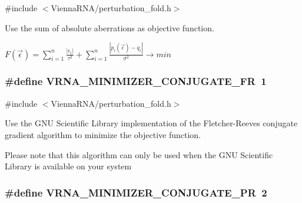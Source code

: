 {\ttfamily \#include $<$Vienna\+R\+N\+A/perturbation\+\_\+fold.\+h$>$}



Use the sum of absolute aberrations as objective function. 

$ F(\vec\epsilon) = \sum_{i = 1}^n{ \frac{|\epsilon_i|}{\tau^2} } + \sum_{i = 1}^n{ \frac{|p_i(\vec\epsilon) - q_i|}{\sigma^2} } \to min $ \hypertarget{group__soft__constraints_gab1d89db58e8c497795a5005f5dbc8c4a}{
\subsubsection[{V\+R\+N\+A\+\_\+\+M\+I\+N\+I\+M\+I\+Z\+E\+R\+\_\+\+C\+O\+N\+J\+U\+G\+A\+T\+E\+\_\+\+F\+R}]{\setlength{\rightskip}{0pt plus 5cm}\#define V\+R\+N\+A\+\_\+\+M\+I\+N\+I\+M\+I\+Z\+E\+R\+\_\+\+C\+O\+N\+J\+U\+G\+A\+T\+E\+\_\+\+F\+R~1}}\label{group__soft__constraints_gab1d89db58e8c497795a5005f5dbc8c4a}


{\ttfamily \#include $<$Vienna\+R\+N\+A/perturbation\+\_\+fold.\+h$>$}



Use the G\+N\+U Scientific Library implementation of the Fletcher-\/\+Reeves conjugate gradient algorithm to minimize the objective function. 

Please note that this algorithm can only be used when the G\+N\+U Scientific Library is available on your system \hypertarget{group__soft__constraints_ga5aaeafe1b0aa77a5cda18943ff94b02f}{
\subsubsection[{V\+R\+N\+A\+\_\+\+M\+I\+N\+I\+M\+I\+Z\+E\+R\+\_\+\+C\+O\+N\+J\+U\+G\+A\+T\+E\+\_\+\+P\+R}]{\setlength{\rightskip}{0pt plus 5cm}\#define V\+R\+N\+A\+\_\+\+M\+I\+N\+I\+M\+I\+Z\+E\+R\+\_\+\+C\+O\+N\+J\+U\+G\+A\+T\+E\+\_\+\+P\+R~2}}\label{group__soft__constraints_ga5aaeafe1b0aa77a5cda18943ff94b02f}


